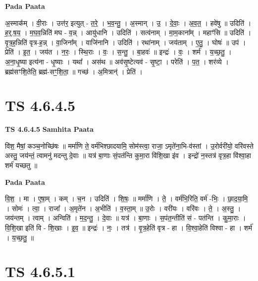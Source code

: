 \documentclass[17pt]{extarticle}
\begin{document}
\textbf{Pada Paata} \newline

अ॒स्माक᳚म् । वी॒राः । उत्त॑र॒ इत्युत् - त॒रे॒ । भ॒व॒न्तु॒ । अ॒स्मान् । उ॒ । दे॒वाः॒ । अ॒व॒त॒ । हवे॑षु ॥ उदिति॑ । ह॒र्॒.ष॒य॒ । म॒घ॒व॒न्निति॑ मघ - व॒न्न् । आयु॑धानि । उदिति॑ । सत्व॑नाम् । मा॒म॒काना᳚म् । महाꣳ॑सि ॥ उदिति॑ । वृ॒त्र॒ह॒न्निति॑ वृत्र-ह॒न्न् । वा॒जिना᳚म् । वाजि॑नानि । उदिति॑ । रथा॑नाम् । जय॑ताम् । ए॒तु॒ । घोषः॑ ॥ उप॑ । प्रेति॑ । इ॒त॒ । जय॑त । न॒रः॒ । स्थि॒राः । वः॒ । स॒न्तु॒ । बा॒हवः॑ ॥ इन्द्रः॑ । वः॒ । शर्म॑ । य॒च्छ॒तु॒ । अ॒ना॒धृ॒ष्या इत्य॑ना - धृ॒ष्याः । यथा᳚ । अस॑थ ॥ अव॑सृ॒ष्टेत्यव॑ - सृ॒ष्टा॒ । परेति॑ । प॒त॒ । शर॑व्ये । ब्रह्म॑सꣳशि॒तेति॒ ब्रह्म॑-सꣳ॒॒शि॒ता॒ ॥ गच्छ॑ । अ॒मित्रान्॑ । प्रेति॑ ।  \newline




\section*{ TS 4.6.4.5 }

\textbf{TS 4.6.4.5 } \newline
\textbf{Samhita Paata} \newline

वि॑श॒ मैषां॒ कञ्च॒नोच्छि॑षः ॥ मर्मा॑णि ते॒ वर्म॑भिश्छादयामि॒ सोम॑स्त्वा॒ राजा॒ ऽमृते॑ना॒भि-व॑स्तां । उ॒रोर्वरी॑यो॒ वरि॑वस्ते अस्तु॒ जय॑न्तं॒ त्वामनु॑ मदन्तु दे॒वाः ॥ यत्र॑ बा॒णाः सं॒पत॑न्ति कुमा॒रा वि॑शि॒खा इ॑व । इन्द्रो॑ न॒स्तत्र॑ वृत्र॒हा वि॑श्वा॒हा शर्म॑ यच्छतु ॥ \newline

\textbf{Pada Paata} \newline

वि॒श॒ । मा । ए॒षा॒म् । कम् । च॒न । उदिति॑ । शि॒षः॒ ॥ मर्मा॑णि । ते॒ । वर्म॑भि॒रिति॒ वर्म॑ -भिः॒ । छा॒द॒या॒मि॒ । सोमः॑ । त्वा॒ । राजा᳚ । अ॒मृते॑न । अ॒भीति॑ । व॒स्ता॒म् ॥ उ॒रोः । वरी॑यः । वरि॑वः । ते॒ । अ॒स्तु॒ । जय॑न्तम् । त्वाम् । अन्विति॑ । म॒द॒न्तु॒ । दे॒वाः ॥ यत्र॑ । बा॒णाः । स॒पंत॒न्तीति॑ सं - पत॑न्ति । कु॒मा॒राः । वि॒शि॒खा इति॑ वि - शि॒खाः । इ॒व॒ ॥ इन्द्रः॑ । नः॒ । तत्र॑ । वृ॒त्र॒हेति॑ वृत्र - हा । वि॒श्वा॒हेति॑ विश्वा - हा । शर्म॑ । य॒च्छ॒तु॒ ॥  \newline




\section*{ TS 4.6.5.1 }
\end{document}
